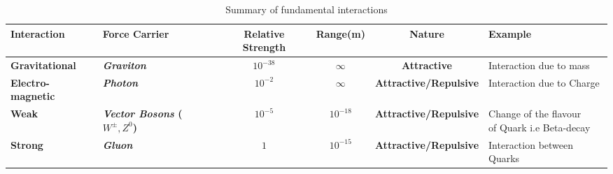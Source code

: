 \begin{table}[ht]
        \centering
        \begin{adjustbox}{width=1\textwidth}
        {\Large
        \begin{tabular}{|l|l|c|c|c|p{5cm}|}
            \hline
            \textbf{Interaction} & \textbf{Force Carrier} & \textbf{Relative Strength} & \textbf{Range(m)} & \textbf{Nature} & \textbf{Example}\\[0.5cm]
            \hline
              
            \textbf{Gravitational} & \textbf{\emph{Graviton}} & $10^{-38}$ & $\infty$ & \textbf{Attractive} & {Interaction due to mass} \\[1.25cm]
              
            \textbf{Electro-magnetic} & \textbf{\emph{Photon}} & $10^{-2}$ & $\infty$ & \textbf{Attractive/Repulsive} & {Interaction due to Charge} \\[1.25cm]
              
            \textbf{Weak} & \textbf{\emph{Vector Bosons} \newline ($W^\pm,Z^0$)} & $10^{-5}$ & $10^{-18}$ & \textbf{Attractive/Repulsive} & {Change of the flavour \newline of Quark i.e Beta-decay} \\[1.25cm]
              
            \textbf{Strong} & \textbf{\emph{Gluon}} & $1$ & $10^{-15}$ & \textbf{Attractive/Repulsive} & {Interaction between Quarks}\\[1.25cm]\hline
    
    \end{tabular}}
    \end{adjustbox}
\caption{Summary of fundamental interactions}
\label{tab:table_1}
\end{table}
    
